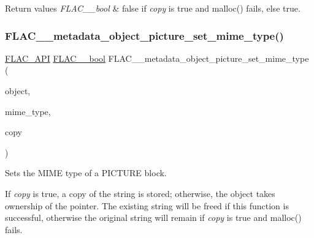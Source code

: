 \begin{DoxyRetVals}{Return values}
{\em F\+L\+A\+C\+\_\+\+\_\+bool} & {\ttfamily false} if {\itshape copy} is {\ttfamily true} and malloc() fails, else {\ttfamily true}. \\
\hline
\end{DoxyRetVals}
\mbox{\label{group__flac__metadata__object_ga5db3363648b6e7693e032f200f241e85}} 
\subsubsection{\texorpdfstring{F\+L\+A\+C\+\_\+\+\_\+metadata\+\_\+object\+\_\+picture\+\_\+set\+\_\+mime\+\_\+type()}{FLAC\_\_metadata\_object\_picture\_set\_mime\_type()}}
{\footnotesize\ttfamily \hyperlink{group__flac__export_ga56ca07df8a23310707732b1c0007d6f5}{F\+L\+A\+C\+\_\+\+A\+PI} \hyperlink{ordinals_8h_a95103469f1cbd78b8cf250194985b34e}{F\+L\+A\+C\+\_\+\+\_\+bool} F\+L\+A\+C\+\_\+\+\_\+metadata\+\_\+object\+\_\+picture\+\_\+set\+\_\+mime\+\_\+type (\begin{DoxyParamCaption}\item[{\hyperlink{struct_f_l_a_c_____stream_metadata}{F\+L\+A\+C\+\_\+\+\_\+\+Stream\+Metadata} $\ast$}]{object,  }\item[{char $\ast$}]{mime\+\_\+type,  }\item[{\hyperlink{ordinals_8h_a95103469f1cbd78b8cf250194985b34e}{F\+L\+A\+C\+\_\+\+\_\+bool}}]{copy }\end{DoxyParamCaption})}

Sets the M\+I\+ME type of a P\+I\+C\+T\+U\+RE block.

If {\itshape copy} is {\ttfamily true}, a copy of the string is stored; otherwise, the object takes ownership of the pointer. The existing string will be freed if this function is successful, otherwise the original string will remain if {\itshape copy} is {\ttfamily true} and malloc() fails.

